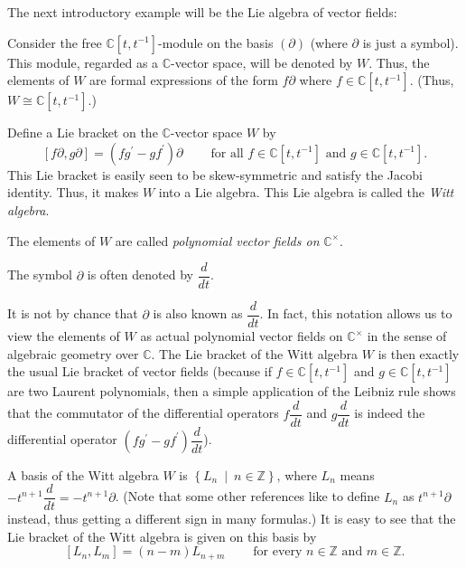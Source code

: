\documentclass[etingof-lie.tex]{subfiles}
\begin{document}
The next introductory example will be the Lie algebra of vector fields:

\begin{definition}
Consider the free $\mathbb{C}\left[  t,t^{-1}\right]  $-module on the basis
$\left(  \partial\right)  $ (where $\partial$ is just a symbol). This module,
regarded as a $\mathbb{C}$-vector space, will be denoted by $W$. Thus, the
elements of $W$ are formal expressions of the form $f\partial$ where
$f\in\mathbb{C}\left[  t,t^{-1}\right]  $. (Thus, $W\cong\mathbb{C}\left[
t,t^{-1}\right]  $.)

Define a Lie bracket on the $\mathbb{C}$-vector space $W$ by%
\[
\left[  f\partial,g\partial\right]  =\left(  fg^{\prime}-gf^{\prime}\right)
\partial\ \ \ \ \ \ \ \ \ \ \text{for all }f\in\mathbb{C}\left[
t,t^{-1}\right]  \text{ and }g\in\mathbb{C}\left[  t,t^{-1}\right]  .
\]
This Lie bracket is easily seen to be skew-symmetric and satisfy the Jacobi
identity. Thus, it makes $W$ into a Lie algebra. This Lie algebra is called
the \textit{Witt algebra}.

The elements of $W$ are called \textit{polynomial vector fields on
}$\mathbb{C}^{\times}$.

The symbol $\partial$ is often denoted by $\dfrac{d}{dt}$.
\end{definition}

\begin{remark}
It is not by chance that $\partial$ is also known as $\dfrac{d}{dt}$. In fact,
this notation allows us to view the elements of $W$ as actual polynomial
vector fields on $\mathbb{C}^{\times}$ in the sense of algebraic geometry over
$\mathbb{C}$. The Lie bracket of the Witt algebra $W$ is then exactly the
usual Lie bracket of vector fields (because if $f\in\mathbb{C}\left[
t,t^{-1}\right]  $ and $g\in\mathbb{C}\left[  t,t^{-1}\right]  $ are two
Laurent polynomials, then a simple application of the Leibniz rule shows that
the commutator of the differential operators $f\dfrac{d}{dt}$ and $g\dfrac
{d}{dt}$ is indeed the differential operator $\left(  fg^{\prime}-gf^{\prime
}\right)  \dfrac{d}{dt}$).
\end{remark}

A basis of the Witt algebra $W$ is $\left\{  L_{n}\ \mid\ n\in\mathbb{Z}%
\right\}  $, where $L_{n}$ means $-t^{n+1}\dfrac{d}{dt}=-t^{n+1}\partial$.
(Note that some other references like to define $L_{n}$ as $t^{n+1}\partial$
instead, thus getting a different sign in many formulas.) It is easy to see
that the Lie bracket of the Witt algebra is given on this basis by
\[
\left[  L_{n},L_{m}\right]  =\left(  n-m\right)  L_{n+m}%
\ \ \ \ \ \ \ \ \ \ \text{for every }n\in\mathbb{Z}\text{ and }m\in
\mathbb{Z}.
\]
\end{document}
